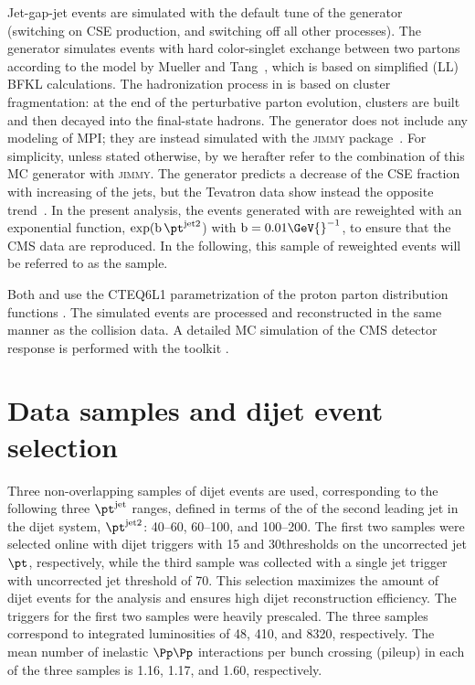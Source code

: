 \documentclass[11pt,twoside,a4paper,cmspaper,final,collab]{cms-tdr}
\begin{document}
Jet-gap-jet events are simulated with the default tune of the  generator~\cite{herwig} (switching on CSE production, and switching off all other processes). The  generator simulates events with hard color-singlet exchange between two partons according to the model by Mueller and Tang~\cite{mt}, which is based on simplified (LL) BFKL calculations. The hadronization process in \HERWIG is based on cluster fragmentation: at the end of the perturbative parton evolution, clusters are built and then decayed into the final-state hadrons. The  generator does not include any modeling of MPI; they are instead simulated with the \textsc{jimmy} package~\cite{jimmy}. For simplicity, unless stated otherwise, by  we herafter refer to the combination of this MC generator with \textsc{jimmy}. The  generator predicts a decrease of the CSE fraction with increasing \pt of the jets, but the Tevatron data show instead the opposite trend~\cite{d01,cdf1}. In the present analysis, the events generated with  are reweighted with an exponential function, $\exp(\mathrm{b} \, \pt^{\text{jet2}}$) with $\mathrm{b}=0.01\GeV{}^{-1}$, to ensure that the CMS data are reproduced. In the following, this sample of reweighted \HERWIG events will be referred to as the  sample.


Both  and  use the CTEQ6L1 pa\-ram\-etri\-za\-tion of the proton parton distribution functions \cite{cteq6l}. The simulated events are processed and reconstructed in the same manner as the collision data. A detailed MC simulation of the CMS detector response is performed with the \GEANTfour toolkit \cite{geant}.

\section{Data samples and dijet event selection}
\label{offline}

Three non-overlapping samples of dijet events are used, corresponding to the following three $\pt^{\text{jet}}$ ranges, defined in terms of the \pt of the second leading jet in the dijet system, $\pt^{\text{jet2}}$: 40--60, 60--100, and 100--200\GeV. The first two samples were selected online with dijet triggers with 15 and 30\GeV thresholds on the uncorrected jet $\pt$, respectively, while the third sample was collected with a single jet trigger with uncorrected jet \pt threshold of 70\GeV. This selection maximizes the amount of dijet events for the analysis and ensures high dijet reconstruction efficiency. The triggers for the first two samples were heavily prescaled. The three samples correspond to integrated luminosities of 48, 410, and 8320\nbinv, respectively. The mean number of inelastic $\Pp\Pp$ interactions per bunch crossing (pileup) in each of the three samples is  1.16, 1.17, and 1.60, respectively.
\end{document}
